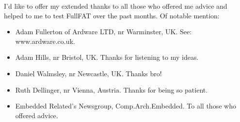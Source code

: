 I'd like to offer my extended thanks to all those who offered me advice and helped to me to test FullFAT over the past months.
\newline
\newline
Of notable mention:
\begin{itemize}
\item Adam Fullerton of Ardware LTD, nr Warminster, UK. See: www.ardware.co.uk.
\item Adam Hills, nr Bristol, UK. Thanks for listening to my ideas.
\item Daniel Walmsley, nr Newcastle, UK. Thanks bro!
\item Ruth Dellinger, nr Vienna, Austria. Thanks for being so patient.
\item Embedded Related's Newsgroup, Comp.Arch.Embedded. To all those who offered advice.
\end{itemize}

